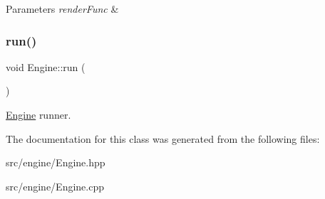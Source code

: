 \begin{DoxyParams}{Parameters}
{\em render\+Func} & \\
\hline
\end{DoxyParams}
\mbox{\label{classEngine_a1a210cf30d6bd330b3649439ecd6d6cc}} 
\subsubsection{\texorpdfstring{run()}{run()}}
{\footnotesize\ttfamily void Engine\+::run (\begin{DoxyParamCaption}{ }\end{DoxyParamCaption})}



\mbox{\hyperlink{classEngine}{Engine}} runner. 



The documentation for this class was generated from the following files\+:\begin{DoxyCompactItemize}
\item 
src/engine/Engine.\+hpp\item 
src/engine/Engine.\+cpp\end{DoxyCompactItemize}

